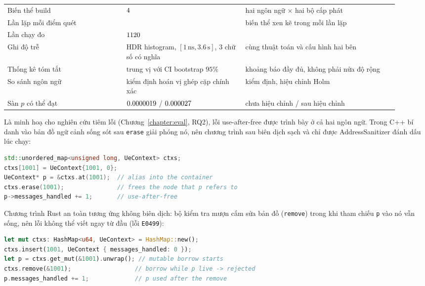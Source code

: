 \begin{table}[H]
\begin{tabular}{@{}R{0.28\linewidth} R{0.28\linewidth} R{0.36\linewidth}@{}}
Biến thể build & $4$ & hai ngôn ngữ $\times$ hai bộ cấp phát \\
Lần lặp mỗi điểm quét & \NRepeats{} & biến thể xen kẽ trong mỗi lần lặp \\
Lần chạy đo & $1120$ & \\
Ghi độ trễ & HDR histogram, $[1\,\text{ns}, 3.6\,\text{s}]$, 3 chữ số có nghĩa & cùng thuật toán và cấu hình hai bên \\
Thống kê tóm tắt & trung vị với CI bootstrap $95\%$ & khoảng báo đầy đủ, không phải nửa độ rộng \\
So sánh ngôn ngữ & kiểm định hoán vị ghép cặp chính xác & \NTests{} kiểm định, hiệu chỉnh Holm \\
Sàn $p$ có thể đạt & $0.0000019$ / $0.000027$ & chưa hiệu chỉnh / sau hiệu chỉnh \\
\hline
\end{tabular}
\end{table}

Là minh hoạ cho nghiên cứu tiêm lỗi (Chương~\ref{chapter:eval}, RQ2), lỗi use-after-free được
trình bày ở cả hai ngôn ngữ. Trong C++ bí danh vào bản đồ ngữ cảnh
sống sót sau \texttt{erase} giải phóng nó, nên chương trình sau biên dịch sạch và chỉ được
AddressSanitizer đánh dấu lúc chạy:

\begin{lstlisting}[language=C++]
std::unordered_map<unsigned long, UeContext> ctxs;
ctxs[1001] = UeContext{1001, 0};
UeContext* p = &ctxs.at(1001);  // alias into the container
ctxs.erase(1001);               // frees the node that p refers to
p->messages_handled += 1;       // use-after-free
\end{lstlisting}

Chương trình Rust an toàn tương ứng không biên dịch: bộ kiểm tra mượn cấm sửa bản đồ
(\texttt{remove}) trong khi tham chiếu \texttt{p} vào nó vẫn sống, nên lỗi không thể viết ngay từ
đầu (lỗi \texttt{E0499}):

\begin{lstlisting}[language=Rust]
let mut ctxs: HashMap<u64, UeContext> = HashMap::new();
ctxs.insert(1001, UeContext { messages_handled: 0 });
let p = ctxs.get_mut(&1001).unwrap(); // mutable borrow starts
ctxs.remove(&1001);                  // borrow while p live -> rejected
p.messages_handled += 1;             // p used after the remove
\end{lstlisting}
